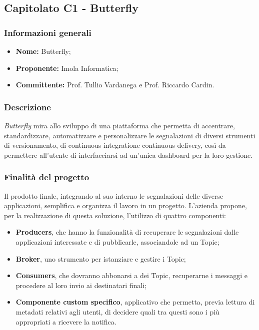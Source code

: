 \subsection{Capitolato C1 - Butterfly}
\subsubsection{Informazioni generali}
\begin{itemize}
\item
\textbf{Nome:} Butterfly;
\item
\textbf{Proponente:} Imola Informatica;
\item
\textbf{Committente:} Prof. Tullio Vardanega e Prof. Riccardo Cardin.
\end{itemize}
\subsubsection{Descrizione}
\textit{Butterfly} mira allo sviluppo di una piattaforma che permetta di
 accentrare, standardizzare, automatizzare e personalizzare le segnalazioni di
 diversi strumenti di versionamento, di continuous integration\glosp e continuous delivery\glo , così da permettere all'utente di interfacciarsi ad un'unica dashboard per la loro gestione.
\subsubsection{Finalità del progetto}
Il prodotto finale, integrando al suo interno le segnalazioni delle diverse 
applicazioni, semplifica e organizza il lavoro in un progetto. L'azienda propone,
per la realizzazione di questa soluzione, l'utilizzo di quattro componenti:
\begin{itemize}
	\item \textbf{Producers}, che hanno la funzionalità di recuperare le segnalazioni dalle applicazioni interessate e di pubblicarle, associandole ad un Topic;
	\item \textbf{Broker}, uno strumento per istanziare e gestire i Topic;
	\item \textbf{Consumers}, che dovranno abbonarsi a dei Topic, recuperarne i messaggi e procedere al loro invio ai destinatari finali;
    \item \textbf{Componente custom specifico}, applicativo che permetta, previa lettura di metadati relativi agli utenti, di decidere quali tra questi sono i più appropriati a ricevere la notifica.
\end{itemize}

